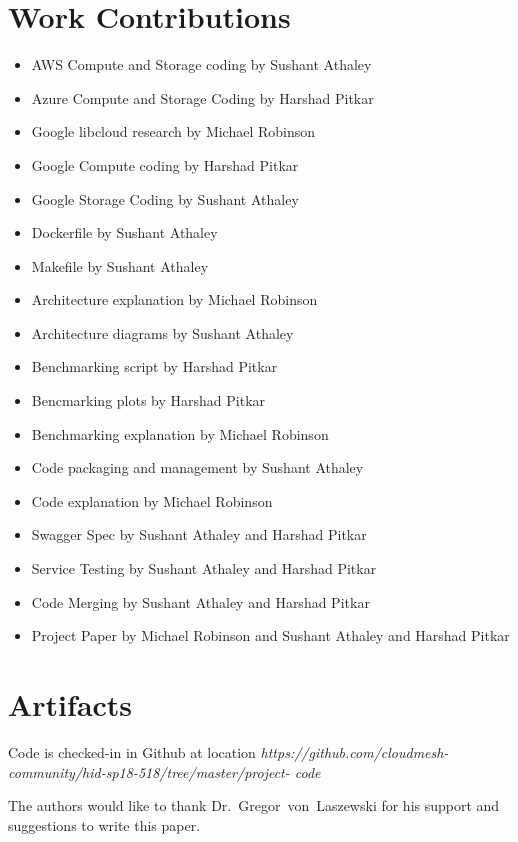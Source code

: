 \section{Work Contributions}
\begin{itemize}
\item
AWS Compute and Storage coding by Sushant Athaley
\item
Azure Compute and Storage Coding by Harshad Pitkar
\item
Google libcloud research by Michael Robinson
\item
Google Compute coding by Harshad Pitkar
\item
Google Storage Coding by Sushant Athaley
\item
Dockerfile by Sushant Athaley
\item
Makefile by Sushant Athaley
\item
Architecture explanation by Michael Robinson
\item
Architecture diagrams by Sushant Athaley
\item
Benchmarking script by Harshad Pitkar
\item
Bencmarking plots by Harshad Pitkar
\item
Benchmarking explanation by Michael Robinson
\item
Code packaging and management by Sushant Athaley
\item
Code explanation by Michael Robinson
\item
Swagger Spec by Sushant Athaley and Harshad Pitkar
\item
Service Testing by Sushant Athaley and Harshad Pitkar
\item
Code Merging by Sushant Athaley and Harshad Pitkar
\item
Project Paper by Michael Robinson and Sushant Athaley and Harshad Pitkar
\end{itemize}

\section{Artifacts}

Code is checked-in in Github at location
\emph{https://github.com/cloudmesh-community/hid-sp18-518/tree/master/project-
code}

\begin{acks}

  The authors would like to thank Dr.~Gregor~von~Laszewski for his
  support and suggestions to write this paper.

\end{acks}


 


